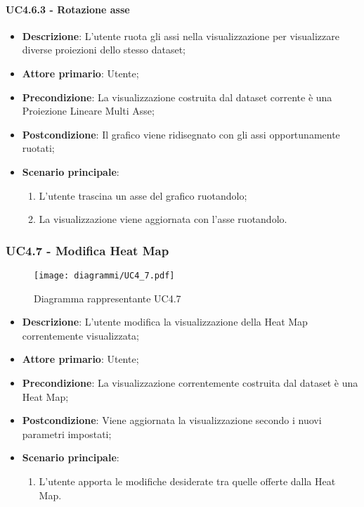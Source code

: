 \paragraph{UC4.6.3 - Rotazione asse}
\label{par:uc4.6.3}
\begin{itemize}
    \item \textbf{Descrizione}: L'utente ruota gli assi nella visualizzazione per visualizzare diverse proiezioni dello stesso dataset;
    \item \textbf{Attore primario}: Utente;
    \item \textbf{Precondizione}: La visualizzazione costruita dal dataset corrente è una Proiezione Lineare Multi Asse;
    \item \textbf{Postcondizione}: Il grafico viene ridisegnato con gli assi opportunamente ruotati;
    \item \textbf{Scenario principale}:
    \begin{enumerate}
        \item L'utente trascina un asse del grafico ruotandolo;
	    \item La visualizzazione viene aggiornata con l'asse ruotandolo.
    \end{enumerate}
\end{itemize}

\newpage

\subsubsection{UC4.7 - Modifica Heat Map}
\label{ssub:uc4.7}
\begin{figure}[h]
    \centering
    \texttt{[image: diagrammi/UC4\_7.pdf]}
    \caption{Diagramma rappresentante UC4.7}
    \label{fig:UC4.7}
\end{figure}


\begin{itemize}
    \item \textbf{Descrizione}: L’utente modifica la visualizzazione della Heat Map correntemente visualizzata;

    \item \textbf{Attore primario}: Utente;

    \item \textbf{Precondizione}:   La visualizzazione correntemente costruita dal dataset è una Heat Map;

    \item \textbf{Postcondizione}:  Viene aggiornata la visualizzazione secondo i nuovi parametri impostati;

	\item \textbf{Scenario principale}:
		\begin{enumerate}
            \item L'utente apporta le modifiche desiderate tra quelle offerte dalla Heat Map.
        \end{enumerate}
\end{itemize}

